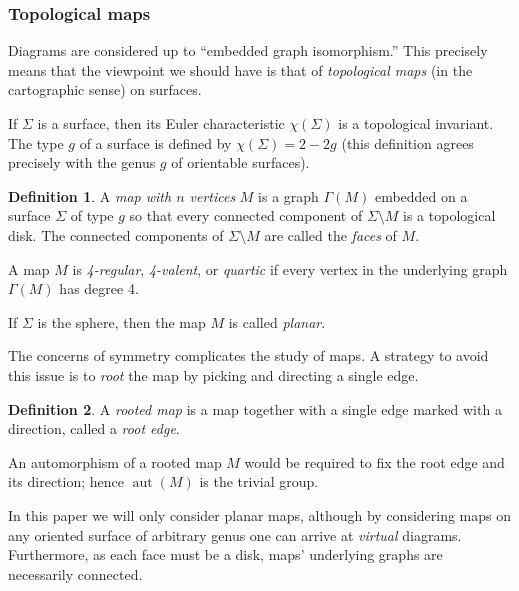 \documentclass[amsmath,longbibliography,secnumarabic,floatfix,amssymb,nofootinbib,nobibnotes,letterpaper,11pt,tightenlines,notitlepage,showkeys,showlabels]{amsart}%
\newcommand{\ArbSurf}{\Sigma}
\newcommand{\GraphOf}[1]{\Gamma(#1)}
\DeclareMathOperator{\Aut}{aut}
\theoremstyle{definition}
\newtheorem*{definition}{Definition}
\begin{document}
\subsubsection{Topological maps}
\label{sec:topmapdefs}

Diagrams are considered up to ``embedded graph isomorphism.'' This
precisely means that the viewpoint we should have is that of
\emph{topological maps} (in the cartographic sense) on
surfaces.

If $\ArbSurf$ is a surface, then its Euler characteristic
$\chi(\ArbSurf)$ is a topological invariant. The type $g$ of a surface
is defined by $\chi(\ArbSurf) = 2 - 2g$ (this definition agrees
precisely with the genus $g$ of orientable surfaces).

\begin{definition}
  A \emph{map with $n$ vertices} $M$ is a graph $\GraphOf M$ embedded
  on a surface $\ArbSurf$ of type $g$ so that every connected
  component of $\ArbSurf \setminus M$ is a topological disk. The
  connected components of $\ArbSurf \setminus M$ are called the
  \emph{faces} of $M$.

  A map $M$ is \emph{4-regular},
  \emph{4-valent}, or \emph{quartic} if every vertex in the underlying
  graph $\GraphOf M$ has degree 4.

  If $\ArbSurf$ is the sphere, then the map $M$ is called \emph{planar}.
\end{definition}

The concerns of symmetry complicates the study of maps. A strategy to
avoid this issue is to \emph{root} the map by picking and directing a
single edge.

\begin{definition}
  A \emph{rooted map} is a map
  together with a single edge marked with a direction, called a
  \emph{root edge}.

  An automorphism of a rooted map $M$ would be required to fix the
  root edge and its direction; hence $\Aut(M)$ is the trivial group.
\end{definition}

In this paper we will only consider planar maps, although by
considering maps on any oriented surface of arbitrary genus one can
arrive at \emph{virtual} diagrams. Furthermore, as each face must be a
disk, maps' underlying graphs are necessarily connected.
\end{document}
